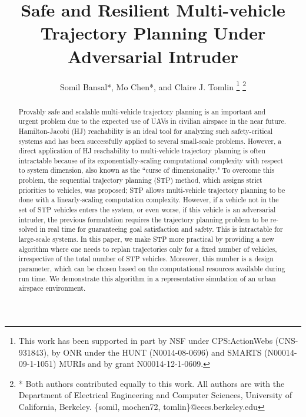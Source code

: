 \documentclass[journal]{IEEEtran}
\title{\LARGE \bf Safe and Resilient Multi-vehicle Trajectory Planning Under Adversarial Intruder}
\author{Somil Bansal*, Mo Chen*, and Claire J. Tomlin
\thanks{This work has been supported in part by NSF under CPS:ActionWebs (CNS-931843), by ONR under the HUNT (N0014-08-0696) and SMARTS (N00014-09-1-1051) MURIs and by grant N00014-12-1-0609.}
\thanks{* Both authors contributed equally to this work. All authors are with the Department of Electrical Engineering and Computer Sciences, University of California, Berkeley. \{somil, mochen72, tomlin\}@eecs.berkeley.edu}
}
\begin{document}
\maketitle
\thispagestyle{empty}
\pagestyle{empty}

\begin{abstract}
Provably safe and scalable multi-vehicle trajectory planning is an important and urgent problem due to the expected use of UAVs in civilian airspace in the near future. Hamilton-Jacobi (HJ) reachability is an ideal tool for analyzing such safety-critical systems and has been successfully applied to several small-scale problems. However, a direct application of HJ reachability to multi-vehicle trajectory planning is often intractable because of its exponentially-scaling computational complexity with respect to system dimension, also known as the ``curse of dimensionality." To overcome this problem, the sequential trajectory planning (STP) method, which assigns strict priorities to vehicles, was proposed; STP allows multi-vehicle trajectory planning to be done with a linearly-scaling computation complexity. However, if a vehicle not in the set of STP vehicles enters the system, or even worse, if this vehicle is an adversarial intruder, the previous formulation requires the trajectory planning problem to be re-solved in real time for guaranteeing goal satisfaction and safety. This is intractable for large-scale systems. In this paper, we make STP more practical by providing a new algorithm where one needs to replan trajectories only for a fixed number of vehicles, irrespective of the total number of STP vehicles. Moreover, this number is a design parameter, which can be chosen based on the computational resources available during run time. We demonstrate this algorithm in a representative simulation of an urban airspace environment.    
\end{abstract}









%








\end{document}
